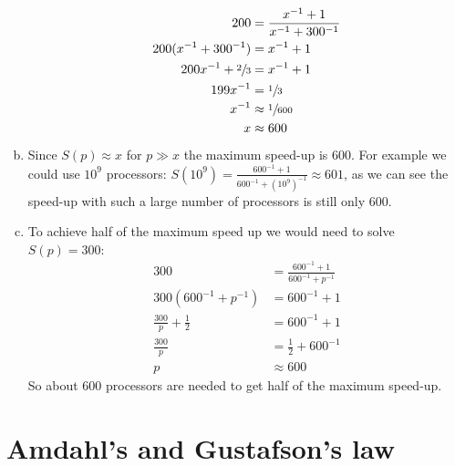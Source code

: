\documentclass[a4paper]{article}
\begin{document}
\begin{enumerate}[(a)]
		\begin{align*}
			200 &= \frac{x^{-1} + 1}{x^{-1} + 300^{-1}} \\
			200 (x^{-1} + 300^{-1}) &= x^{-1} + 1 \\
			200 x^{-1} + \sfrac{2}{3} &= x^{-1} + 1 \\
			199 x^{-1} &= \sfrac{1}{3} \\
			x^{-1} &\approx \sfrac{1}{600} \\
			x &\approx 600
		\end{align*}
	\item Since $S(p) \approx x$ for $p \gg x$ the maximum speed-up is 600. For example we could use $10^9$ processors: $\displaystyle S(10^9) = \frac{600^{-1} + 1}{600^{-1} + (10^9)^{-1}} \approx 601$, as we can see the speed-up with such a large number of processors is still only 600.
	\item To achieve half of the maximum speed up we would need to solve $S(p) = 300$:
		\begin{align*}
			300 &= \frac{600^{-1} + 1}{600^{-1} + p^{-1}} \\
			300 (600^{-1} + p^{-1}) &= 600^{-1} + 1 \\
			\frac{300}{p} + \frac{1}{2} &= 600^{-1} + 1 \\
			\frac{300}{p} &= \frac{1}{2} + 600^{-1} \\
			p &\approx 600
		\end{align*}
		So about 600 processors are needed to get half of the maximum speed-up.
\end{enumerate}

\section{Amdahl's and Gustafson's law}
\end{document}
